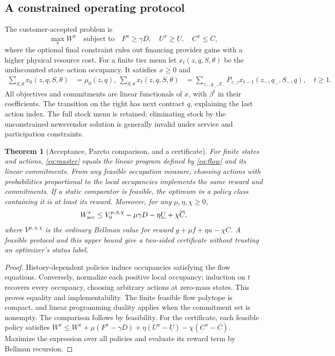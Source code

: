 \documentclass[11pt,letterpaper]{article}
\newtheorem{theorem}{Theorem}[section]
\theoremstyle{definition}
\newcommand{\1}{\mathbf 1}
\begin{document}
\subsection{A constrained operating protocol}
The customer-accepted problem is
\begin{equation}\label{eq:master}
 \max_\pi W^\pi\quad\text{subject to}\quad
 F^\pi\geq\gamma D,\quad U^\pi\geq\underline U,
 \quad C^\pi\leq\overline C,
\end{equation}
where the optional final constraint rules out financing provider gains with a higher physical resource cost. For a finite tier menu let $x_t(z,q,S,\theta)$ be the undiscounted state--action occupancy. It satisfies $x\geq0$ and
\begin{align}
 \sum_{S,\theta}x_0(z,q,S,\theta)&=\mu_0(z,q),\
 \sum_{S,\theta}x_t(z,q,S,\theta)&=
 \sum_{z_-,q_-,S_-}P_{z_-z}x_{t-1}(z_-,q_-,S_-,q),\quad t\geq1.\label{eq:flow}
\end{align}
All objectives and commitments are linear functionals of $x$, with $\beta^t$ in their coefficients. The transition on the right has next contract $q$, explaining the last action index. The full stock menu is retained: eliminating stock by the unconstrained newsvendor solution is generally invalid under service and participation constraints.
\begin{theorem}[Acceptance, Pareto comparison, and a certificate]\label{thm:accepted}
For finite states and actions, \eqref{eq:master} equals the linear program defined by \eqref{eq:flow} and its linear commitments. From any feasible occupation measure, choosing actions with probabilities proportional to the local occupancies implements the same reward and commitments. If a static comparator is feasible, the optimum in a policy class containing it is at least its reward. Moreover, for any $\mu,\eta,\chi\geq0$,
\begin{equation}\label{eq:dual}
 W^*_{\rm acc}\leq V^{\mu,\eta,\chi}_0
           -\mu\gamma D-\eta\underline U+\chi\overline C,
\end{equation}
where $V^{\mu,\eta,\chi}$ is the ordinary Bellman value for reward
$g+\mu f+\eta u-\chi C$. A feasible protocol and this upper bound give a two-sided certificate without trusting an optimizer's status label.
\end{theorem}
\begin{proof}
History-dependent policies induce occupancies satisfying the flow equations. Conversely, normalize each positive local occupancy; induction on $t$ recovers every occupancy, choosing arbitrary actions at zero-mass states. This proves equality and implementability. The finite feasible flow polytope is compact, and linear programming duality applies when the commitment set is nonempty. The comparison follows by feasibility. For the certificate, each feasible policy satisfies
$W^\pi\leq W^\pi+\mu(F^\pi-\gamma D)+\eta(U^\pi-\underline U)-\chi(C^\pi-\overline C)$.
Maximize the expression over all policies and evaluate its reward term by Bellman recursion.\end{proof}
\end{document}

